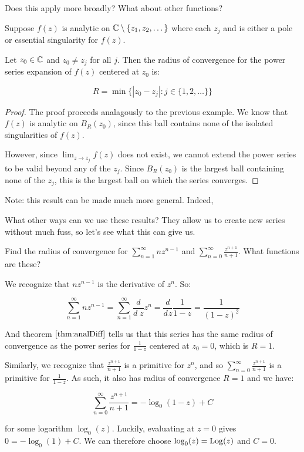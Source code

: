 Does this apply more broadly? What about other functions?

\begin{thmbo}{}{} Suppose $f(z)$ is analytic on $\mathbb{C}\setminus\{z_1,z_2,\dots\}$ where each $z_j$ and is either a pole or essential singularity for $f(z)$.

Let $z_0\in \mathbb{C}$ and $z_0\ne z_j$ for all $j$. Then the radius of convergence for the power series expansion of $f(z)$ centered at $z_0$ is:

$$R = \min\{|z_0-z_j|:j\in\{1, 2,\dots\}\}$$
\end{thmbo}

\begin{proof} The proof proceeds analagously to the previous example. We know that $f(z)$ is analytic on $B_R(z_0)$, since this ball contains none of the isolated singularities of $f(z)$.

However, since $\lim_{z\rightarrow z_j} f(z)$ does not exist, we cannot extend the power series to be valid beyond any of the $z_j$. Since $B_R(z_0)$ is the largest ball containing none of the $z_j$, this is the largest ball on which the series converges.
\end{proof}

Note: this result can be made much more general. Indeed, 

What other ways can we use these results? They allow us to create new series without much fuss, so let's see what this can give us.

\begin{ex}{}{} Find the radius of convergence for $\sum_{n = 1}^\infty nz^{n-1}$ and $\sum_{n = 0}^\infty \frac{z^{n+1}}{n+1}$. What functions are these?

We recognize that $nz^{n-1}$ is the derivative of $z^n$. So:

$$\sum_{n = 1}^\infty nz^{n-1} = \sum_{n = 1}^\infty \frac{d}{d\;z}z^n = \frac{d}{d\hspace{1pt}z}\frac{1}{1-z} = \frac{1}{(1-z)^2}$$

And theorem $\ref{thm:analDiff}$ tells us that this series has the same radius of convergence as the power series for $\frac{1}{1-z}$ centered at $z_0 = 0$, which is $R = 1$.

Similarly, we recognize that $\frac{z^{n+1}}{n+1}$ is a primitive for $z^n$, and so $\sum_{n = 0}^\infty \frac{z^{n+1}}{n+1}$ is a primitive for $\frac{1}{1-z}$. As such, it also has radius of convergence $R = 1$ and we have:

$$\sum_{n = 0}^\infty \frac{z^{n+1}}{n+1} = -\log_0(1-z) + C$$

\noin for some logarithm $\log_0(z)$. Luckily, evaluating at $z = 0$ gives $0 = -\log_0(1) + C$. We can therefore choose $\log_0(z) = \mathrm{Log}(z)$ and $C = 0$.
\end{ex}

